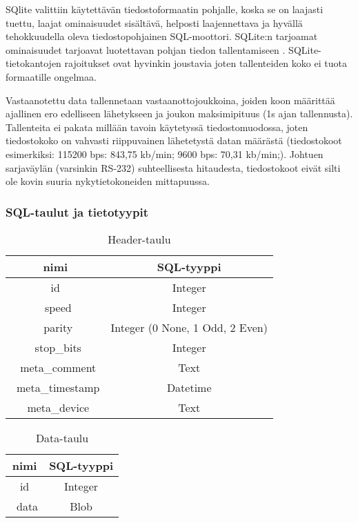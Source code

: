 SQlite valittiin käytettävän tiedostoformaatin pohjalle, koska se on laajasti tuettu, laajat ominaisuudet sisältävä, helposti laajennettava ja hyvällä tehokkuudella oleva tiedostopohjainen SQL-moottori. SQLite:n tarjoamat ominaisuudet tarjoavat luotettavan pohjan tiedon tallentamiseen \cite{sqlite:appfileformat}. SQLite-tietokantojen rajoitukset ovat hyvinkin joustavia joten tallenteiden koko ei tuota formaatille ongelmaa.

Vastaanotettu data tallennetaan vastaanottojoukkoina, joiden koon määrittää ajallinen ero edelliseen lähetykseen ja joukon maksimipituus (1s ajan tallennusta). Tallenteita ei pakata millään tavoin käytetyssä tiedostomuodossa, joten tiedostokoko on vahvasti riippuvainen lähetetystä datan määrästä (tiedostokoot esimerkiksi: 115200 bps: 843,75 kb/min; 9600 bps: 70,31 kb/min;). Johtuen sarjaväylän (varsinkin RS-232) suhteellisesta hitaudesta, tiedostokoot eivät silti ole kovin suuria nykytietokoneiden mittapuussa.


\subsubsection{SQL-taulut ja tietotyypit}

\begin{table}[h]
\centering
\caption{Header-taulu}
\begin{tabular}{ c|c }
\centering
nimi & SQL-tyyppi \\\toprule
id & Integer \\\
speed & Integer \\\
parity & Integer (0 None, 1 Odd, 2 Even) \\\
stop\_bits & Integer \\\
meta\_comment & Text \\\
meta\_timestamp & Datetime \\\
meta\_device & Text \\\bottomrule
\end{tabular}
\end{table}

\vspace{20mm}

\begin{table}[h]
\centering
\caption{Data-taulu}
\begin{tabular}{ c|c }
nimi & SQL-tyyppi \\\toprule
id & Integer \\\
data & Blob \\\bottomrule
\end{tabular}
\end{table}

